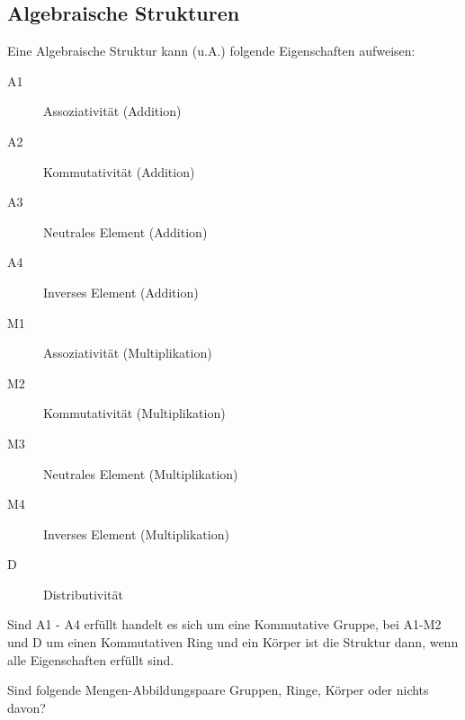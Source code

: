 \documentclass[11pt, a4paper]{article}
\begin{document}
\subsection{Algebraische Strukturen}
Eine Algebraische Struktur kann (u.A.) folgende Eigenschaften aufweisen:
\begin{description}
	\item[A1] Assoziativität (Addition)
	\item[A2] Kommutativität (Addition)
	\item[A3] Neutrales Element (Addition)
	\item[A4] Inverses Element (Addition)
	\item[M1] Assoziativität (Multiplikation)
	\item[M2] Kommutativität (Multiplikation)
	\item[M3] Neutrales Element (Multiplikation)
	\item[M4] Inverses Element (Multiplikation)
	\item[D] Distributivität
\end{description}
Sind A1 - A4 erfüllt handelt es sich um eine Kommutative Gruppe, bei A1-M2 und D um einen Kommutativen Ring und ein Körper ist die Struktur dann, wenn alle Eigenschaften erfüllt sind.

Sind folgende Mengen-Abbildungspaare Gruppen, Ringe, Körper oder nichts davon?
\end{document}
